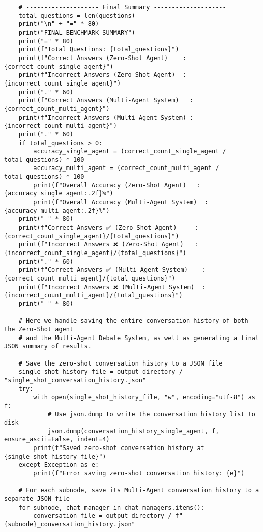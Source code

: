 \begin{lstlisting}
    # -------------------- Final Summary --------------------
    total_questions = len(questions)
    print("\n" + "=" * 80)
    print("FINAL BENCHMARK SUMMARY")
    print("=" * 80)
    print(f"Total Questions: {total_questions}")
    print(f"Correct Answers (Zero-Shot Agent)    : {correct_count_single_agent}")
    print(f"Incorrect Answers (Zero-Shot Agent)  : {incorrect_count_single_agent}")
    print("." * 60)
    print(f"Correct Answers (Multi-Agent System)   : {correct_count_multi_agent}")
    print(f"Incorrect Answers (Multi-Agent System) : {incorrect_count_multi_agent}")
    print("." * 60)
    if total_questions > 0:
        accuracy_single_agent = (correct_count_single_agent / total_questions) * 100
        accuracy_multi_agent = (correct_count_multi_agent / total_questions) * 100
        print(f"Overall Accuracy (Zero-Shot Agent)   : {accuracy_single_agent:.2f}%")
        print(f"Overall Accuracy (Multi-Agent System)  : {accuracy_multi_agent:.2f}%")
    print("-" * 80)
    print(f"Correct Answers ✅ (Zero-Shot Agent)     : {correct_count_single_agent}/{total_questions}")
    print(f"Incorrect Answers ❌ (Zero-Shot Agent)   : {incorrect_count_single_agent}/{total_questions}")
    print("." * 60)
    print(f"Correct Answers ✅ (Multi-Agent System)    : {correct_count_multi_agent}/{total_questions}")
    print(f"Incorrect Answers ❌ (Multi-Agent System)  : {incorrect_count_multi_agent}/{total_questions}")
    print("-" * 80)

    # Here we handle saving the entire conversation history of both the Zero-Shot agent
    # and the Multi-Agent Debate System, as well as generating a final JSON summary of results.

    # Save the zero-shot conversation history to a JSON file
    single_shot_history_file = output_directory / "single_shot_conversation_history.json"
    try:
        with open(single_shot_history_file, "w", encoding="utf-8") as f:
            # Use json.dump to write the conversation history list to disk
            json.dump(conversation_history_single_agent, f, ensure_ascii=False, indent=4)
        print(f"Saved zero-shot conversation history at {single_shot_history_file}")
    except Exception as e:
        print(f"Error saving zero-shot conversation history: {e}")

    # For each subnode, save its Multi-Agent conversation history to a separate JSON file
    for subnode, chat_manager in chat_managers.items():
        conversation_file = output_directory / f"{subnode}_conversation_history.json"


\end{lstlisting}
